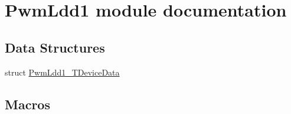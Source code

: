\hypertarget{group___pwm_ldd1__module}{}\section{Pwm\+Ldd1 module documentation}
\label{group___pwm_ldd1__module}
\subsection*{Data Structures}
\begin{DoxyCompactItemize}
\item 
struct \hyperlink{struct_pwm_ldd1___t_device_data}{Pwm\+Ldd1\+\_\+\+T\+Device\+Data}
\end{DoxyCompactItemize}
\subsection*{Macros}
